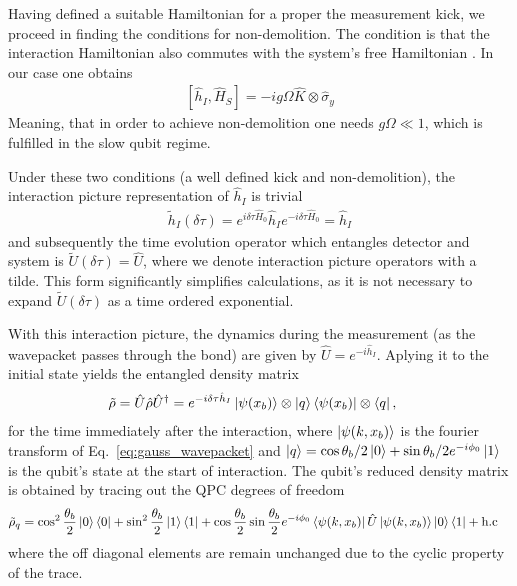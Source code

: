 \documentclass[10pt,
 amsmath,amssymb,
 aps,prb, twocolumn
]{revtex4-2}
\begin{document}
Having defined a suitable Hamiltonian for a proper the measurement kick, we proceed in finding the conditions for non-demolition. The condition is that the interaction Hamiltonian also commutes with the system's free Hamiltonian \cite{braginskyNondemolition1996}. In our case one obtains
\begin{align}
    \left[\hat{h}_I, \hat{H}_S \right] = -ig\Omega \hat{K}\otimes\hat{\sigma}_y
\end{align}
Meaning, that in order to achieve non-demolition one needs \mbox{$ g \Omega\ll1$}, which is fulfilled in the slow qubit regime.

Under these two conditions (a well defined kick and non-demolition), the interaction picture representation of \mbox{$\hat{h}_I$} is trivial 
\begin{align}
    \tilde{h}_I(\delta \tau) = e^{i\delta\tau \hat{H}_0}\hat{h}_I e^{-i\delta\tau \hat{H}_0} = \hat{h}_I
\end{align}
and subsequently the time evolution operator which entangles detector and system is \mbox{$\tilde{U}(\delta\tau) = \hat{U}$}, where we denote interaction picture operators with a tilde. This form significantly simplifies calculations, as it is not necessary to expand \mbox{$\tilde{U}(\delta\tau)$} as a time ordered exponential. 

With this interaction picture, the dynamics during the measurement (as the wavepacket passes through the bond) are given by \mbox{$\hat{U}=e^{-i\hat{h}_I}$}. Aplying it to the initial state yields the entangled density matrix
\begin{align}
    \tilde{\rho}  =  \hat{U} \hat{\rho}\hat{U}^{\dagger}  
    & = e^{-i\delta\tau \hat{h}_I}\ket{\psi (x_b)}\otimes \ket{q}\bra{\psi(x_b)}\otimes\bra{q},
\end{align}
for the time immediately after the interaction, where \mbox{$\ket{\psi(k,x_b)}$} is the fourier transform of Eq.~\eqref{eq:gauss_wavepacket} and \mbox{$\ket{q} = \cos{\theta_b/2}\ket{0}+\sin{\theta_b/2}e^{-i\phi_0}\ket{1}$} is the qubit's state at the start of interaction. The qubit's reduced density matrix is obtained by tracing out the QPC degrees of freedom
\begin{align}
    \tilde{\rho}_q & =  \cos^2{\frac{\theta_b}{2}}\ket{0}\bra{0} 
    + \sin^2{\frac{\theta_b}{2}}\ket{1}\bra{1} 
    + \cos{\frac{\theta_b}{2}}\sin{\frac{\theta_b}{2}}e^{-i\phi_0}\bra{\psi(k,x_b)}\hat{U}\ket{\psi(k,x_b)}\ket{0}\bra{1} + \text{h.c}
\end{align}
 where the off diagonal elements are remain unchanged due to the cyclic property of the trace. 
\end{document}
